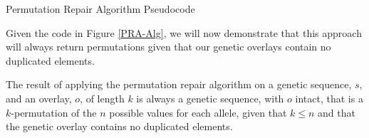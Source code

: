%
%
\begin{algorithm}
	\BlankLine

	
	\BlankLine

	\caption{Permutation Repair Algorithm Pseudocode}
	\label{PRA-Alg}
\end{algorithm}

Given the code in Figure \ref{PRA-Alg}, we will now demonstrate that this approach will always return permutations given that our genetic overlays contain no duplicated elements.

\begin{thm}
The result of applying the permutation repair algorithm on a genetic sequence, $s$, and an overlay, $o$, of length $k$ is always a genetic sequence, with $o$ intact, that is a $k$-permutation of the $n$ possible values for each allele, given that $ k \leq n$ and that the genetic overlay contains no duplicated elements.
\end{thm}

